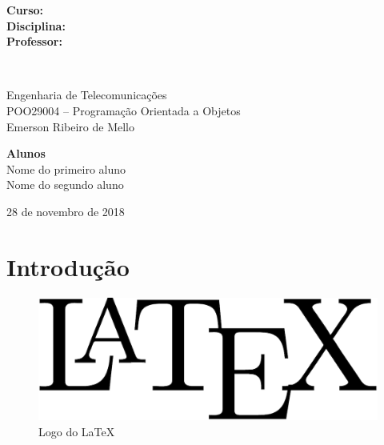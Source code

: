 \documentclass[11pt]{article}
\begin{document}
\begin{titlepage}
\begin{minipage}{.9\linewidth}
\begin{minipage}{0.15\textwidth}
\begin{flushleft} \large
\textbf{Curso:}\\
\textbf{Disciplina:}\\
\textbf{Professor:}
\end{flushleft}
\end{minipage}~
\begin{minipage}{0.9\textwidth}
\begin{flushleft} \large
Engenharia de Telecomunicações\\
POO29004 -- Programação Orientada a Objetos\\
Emerson Ribeiro de Mello
\end{flushleft}
\end{minipage}
\end{minipage}
\vspace{3cm}

\begin{minipage}{.9\linewidth}
\begin{flushright}
\textbf{Alunos}\\
Nome do primeiro aluno\\
Nome do segundo aluno
\end{flushright}
\end{minipage}
\vfill


\begin{center}
28 de novembro de 2018
\end{center}

\end{titlepage}
\pagestyle{plain}








\section{Introdução}
\label{sec:introducao}

\lipsum[1]

\begin{figure}[ht]
    \centering
    \includegraphics[width=.3\linewidth]{figuras/latex-logo}
    \caption{Logo do \LaTeX}
    \label{fig:logolatex}
\end{figure}
\end{document}
